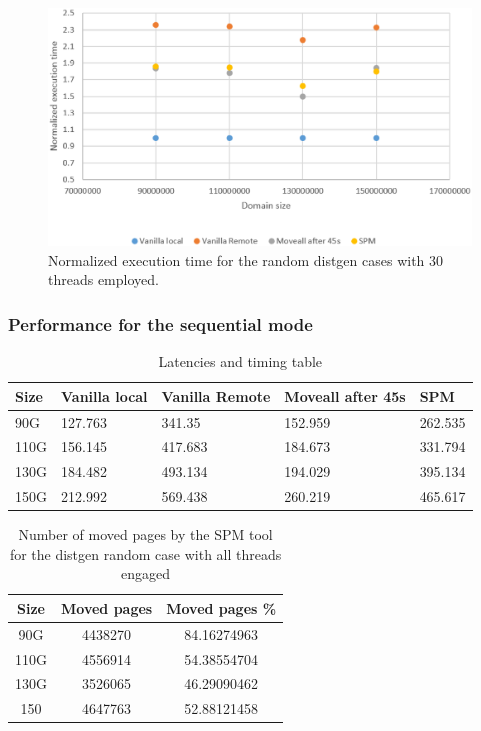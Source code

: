 \begin{figure}[th]
	\centering
		\includegraphics[width=.8\textwidth]{figures/time-dgenat-random.eps}
		\caption{Normalized execution time for the random distgen cases with 30 threads employed.}
		\label{fig:time-dgenatt-ran}
\end{figure}

\subsubsection{Performance for the sequential mode}\label{subsection:time-dgenat-seq.eps}

\begin{table}[th]
	\centering
		\begin{tabularx}{\textwidth}{|l|l|l|l|X|}
		\hline
			Size & Vanilla local & Vanilla Remote & Moveall after 45s & SPM \\
			\hline
			90G & 127.763 & 341.35 & 152.959 & 262.535\\
			\hline
			110G & 156.145 & 417.683 & 184.673 & 331.794\\
			\hline
			130G & 184.482 & 493.134 & 194.029 & 395.134\\
			\hline
			150G & 212.992 & 569.438 & 260.219 & 465.617\\
			\hline
		\end{tabularx}
		\caption{Latencies and timing table}
		\label{table:res-dgenrdmat-movpg}
\end{table}

\begin{table}[th]
	\centering
		\begin{tabularx}{\textwidth}{|c|c|c}
		\hline
			Size & Moved pages & Moved pages \%  \\
			\hline
			90G & 4438270 & 84.16274963 \\
			\hline
			110G & 4556914 & 54.38554704 \\
			\hline
			130G & 3526065 & 46.29090462 \\
			\hline
			150 & 4647763 & 52.88121458 \\
			\hline
		\end{tabularx}
		\caption{Number of moved pages by the SPM tool for the distgen random case with all threads engaged}
		\label{table:res-tbl-dgenmvdseqat}
\end{table}

